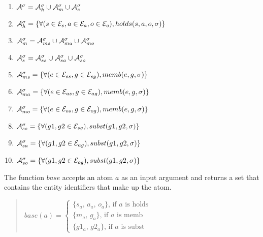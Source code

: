 \documentclass[10pt, twocolumn]{article}
\begin{document}
          \begin{enumerate}
            \item
              ${\cal A}^{\sigma} = {\cal A}^{\sigma}_{h} \cup {\cal A}^{\sigma}_{m} \cup {\cal A}^{\sigma}_{s}$
            \item
              ${\cal A}^{\sigma}_{h} = \{\forall (s \in {\cal E}_{s}, a \in {\cal E}_{a}, o \in {\cal E}_{o}), holds(s, a, o, \sigma) \}$
            \item
              ${\cal A}^{\sigma}_{m} = {\cal A}^{\sigma}_{ms} \cup {\cal A}^{\sigma}_{ma} \cup {\cal A}^{\sigma}_{mo}$
            \item
              ${\cal A}^{\sigma}_{s} = {\cal A}^{\sigma}_{ss} \cup {\cal A}^{\sigma}_{sa} \cup {\cal A}^{\sigma}_{so}$
            \item
              ${\cal A}^{\sigma}_{ms} = \{\forall (e \in {\cal E}_{ss}, g \in {\cal E}_{sg}), memb(e, g, \sigma)\}$
            \item
              ${\cal A}^{\sigma}_{ma} = \{\forall (e \in {\cal E}_{as}, g \in {\cal E}_{ag}), memb(e, g, \sigma)\}$
            \item
              ${\cal A}^{\sigma}_{mo} = \{\forall (e \in {\cal E}_{os}, g \in {\cal E}_{og}), memb(e, g, \sigma)\}$
            \item
              ${\cal A}^{\sigma}_{ss} = \{\forall (g1, g2 \in {\cal E}_{sg}), subst(g1, g2, \sigma)\}$
            \item
              ${\cal A}^{\sigma}_{sa} = \{\forall (g1, g2 \in {\cal E}_{ag}), subst(g1, g2, \sigma)\}$
            \item
              ${\cal A}^{\sigma}_{so} = \{\forall (g1, g2 \in {\cal E}_{og}), subst(g1, g2, \sigma)\}$
          \end{enumerate}

          The function $base$ accepts an atom $a$ as an input argument and
          returns a set that contains the entity identifiers that make up the
          atom.

          \begin{quote}
            \begin{math}
              base(a) = 
              \begin{cases}
                \mbox{\{$s_{a}$, $a_{a}$, $o_{a}$\}, if $a$ is holds} \\
                \mbox{\{$m_{a}$, $g_{a}$\}, if $a$ is memb} \\
                \mbox{\{$g1_{a}$, $g2_{a}$\}, if $a$ is subst}
              \end{cases}
            \end{math}
          \end{quote}
\end{document}
